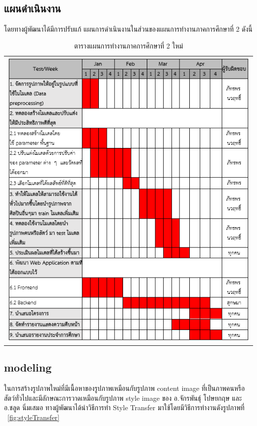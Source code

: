 \documentclass[12pt,oneside,openright,a4paper]{cpe-thai-project}
\begin{document}
\subsection{แผนดำเนินงาน}
โดยทางผู้พัฒนาได้มีการปรับแก้ แผนการดำเนินงานในส่วนของแผนการทำงานภาคการศึกษาที่ 2 ดังนี้

\begin{table}[!h]
  \centering
  \begin{tabular}{c}
  \hfill
  \includegraphics[width=15cm]{./image/newplan.png}
  \hfill
  \end{tabular}
\caption{ตารางแผนการทำงานภาคการศึกษาที่ 2 ใหม่\centering}
\label{tbl:newplan}
\end{table}

\newpage

\subsection{modeling}
\par\setlength{\parindent}{5ex}
ในการสร้างรูปภาพใหม่ที่มีเนื้อหาของรูปภาพเหมือนกับรูปภาพ content image ที่เป็นภาพคนหรือสัตว์ทั่วไปและมีลักษณะการวาดเหมือนกับรูปภาพ style image ของ อ.จักรพันธุ์ โปษยกฤษ และ อ.ชลูด นิ่มเสมอ ทางผู้พัฒนาได้นำวิธีการทำ Style Transfer มาใช้โดยมีวิธีการทำงานดังรูปภาพที่ ~\ref{fig:styleTransfer}
\end{document}
